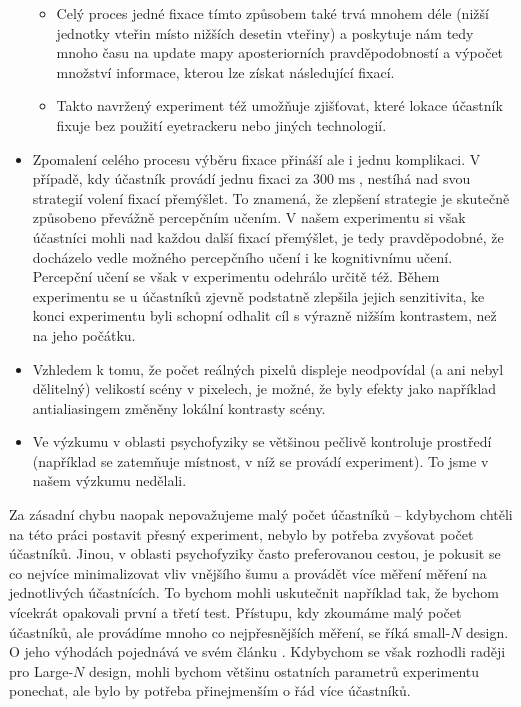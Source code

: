 \begin{itemize}
\begin{itemize}
\item Celý proces jedné fixace tímto způsobem také trvá mnohem déle (nižší
jednotky vteřin místo nižších desetin vteřiny) a poskytuje nám tedy mnoho času
na update mapy aposteriorních pravděpodobností a výpočet množství informace,
kterou lze získat následující fixací.

\item Takto navržený experiment též umožňuje zjišťovat, které lokace účastník
fixuje bez použití eyetrackeru nebo jiných technologií.

\end{itemize}

\item Zpomalení celého procesu výběru fixace přináší ale i jednu komplikaci. V případě, kdy
účastník provádí jednu fixaci za $300\operatorname{ms}$, nestíhá nad svou
strategií volení fixací přemýšlet. To znamená, že zlepšení strategie je
skutečně způsobeno převážně percepčním učením. V našem experimentu si však
účastníci mohli nad každou další fixací přemýšlet, je tedy pravděpodobné, že
docházelo vedle možného percepčního učení  i ke kognitivnímu učení. Percepční
učení se však v experimentu odehrálo určitě též.  Během experimentu se u
účastníků zjevně podstatně zlepšila jejich senzitivita, ke konci experimentu
byli schopní odhalit cíl s výrazně nižším kontrastem, než na jeho počátku.


\item Vzhledem k tomu, že počet reálných pixelů displeje neodpovídal (a ani
nebyl dělitelný) velikostí scény v pixelech, je možné, že byly efekty jako
například antialiasingem změněny lokální kontrasty scény.

\item Ve výzkumu v oblasti psychofyziky se většinou
pečlivě kontroluje prostředí (například se zatemňuje místnost, v níž se provádí experiment). To jsme v našem výzkumu nedělali.

\end{itemize}

Za zásadní chybu naopak nepovažujeme malý počet účastníků -- kdybychom chtěli
na této práci postavit přesný experiment, nebylo by potřeba zvyšovat počet
účastníků. Jinou, v oblasti psychofyziky často preferovanou cestou, je pokusit
se co nejvíce minimalizovat vliv vnějšího šumu a provádět více měření měření na
jednotlivých účastnících. To bychom mohli uskutečnit například tak, že bychom
vícekrát opakovali první a třetí test. Přístupu, kdy zkoumáme malý počet
účastníků, ale provádíme mnoho co nejpřesnějších měření, se říká small-$N$
design. O jeho výhodách pojednává ve svém článku \citet{SmallN}. Kdybychom se
však rozhodli raději pro Large-$N$ design, mohli bychom většinu ostatních
parametrů experimentu ponechat, ale bylo by potřeba přinejmenším o řád více
účastníků.

